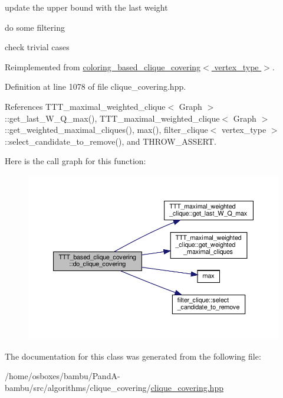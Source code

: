 update the upper bound with the last weight

do some filtering

check trivial cases 

Reimplemented from \hyperlink{classcoloring__based__clique__covering_ab6db4b8e878397afcd5378715d438046}{coloring\+\_\+based\+\_\+clique\+\_\+covering$<$ vertex\+\_\+type $>$}.



Definition at line 1078 of file clique\+\_\+covering.\+hpp.



References T\+T\+T\+\_\+maximal\+\_\+weighted\+\_\+clique$<$ Graph $>$\+::get\+\_\+last\+\_\+\+W\+\_\+\+Q\+\_\+max(), T\+T\+T\+\_\+maximal\+\_\+weighted\+\_\+clique$<$ Graph $>$\+::get\+\_\+weighted\+\_\+maximal\+\_\+cliques(), max(), filter\+\_\+clique$<$ vertex\+\_\+type $>$\+::select\+\_\+candidate\+\_\+to\+\_\+remove(), and T\+H\+R\+O\+W\+\_\+\+A\+S\+S\+E\+RT.

Here is the call graph for this function\+:
\nopagebreak
\begin{figure}[H]
\begin{center}
\leavevmode
\includegraphics[width=350pt]{d7/deb/classTTT__based__clique__covering_af040c67cc904c1a462b3a5efe81a1689_cgraph}
\end{center}
\end{figure}


The documentation for this class was generated from the following file\+:\begin{DoxyCompactItemize}
\item 
/home/osboxes/bambu/\+Pand\+A-\/bambu/src/algorithms/clique\+\_\+covering/\hyperlink{clique__covering_8hpp}{clique\+\_\+covering.\+hpp}\end{DoxyCompactItemize}
